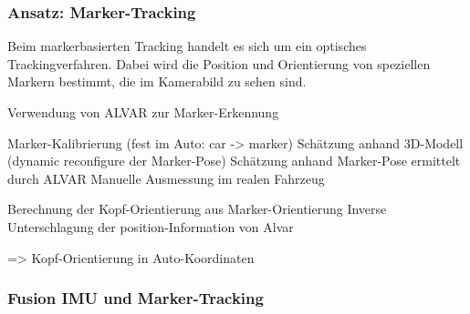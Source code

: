 \subsubsection{Ansatz: Marker-Tracking}

Beim markerbasierten Tracking handelt es sich um ein optisches Trackingverfahren.
Dabei wird die Position und Orientierung von speziellen Markern bestimmt, die im Kamerabild zu sehen sind.

Verwendung von ALVAR zur Marker-Erkennung

Marker-Kalibrierung (fest im Auto: car -> marker)
Schätzung anhand 3D-Modell (dynamic reconfigure der Marker-Pose)
Schätzung anhand Marker-Pose ermittelt durch ALVAR
Manuelle Ausmessung im realen Fahrzeug

Berechnung der Kopf-Orientierung aus Marker-Orientierung
Inverse
Unterschlagung der position-Information von Alvar

=> Kopf-Orientierung in Auto-Koordinaten



\subsubsection{Fusion IMU und Marker-Tracking}

